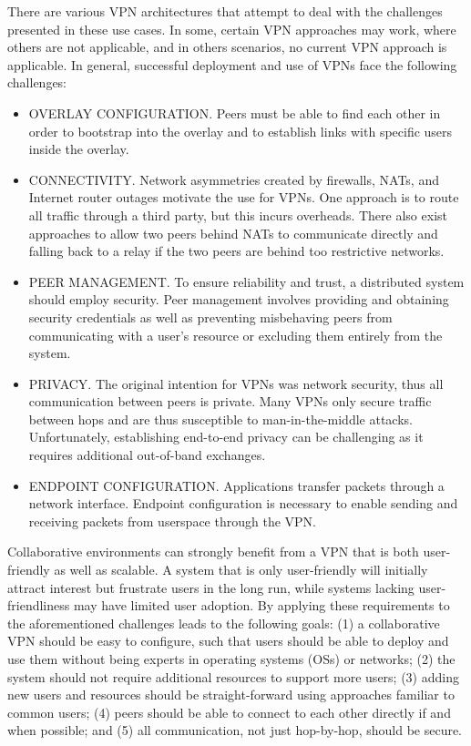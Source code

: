There are various VPN architectures that attempt to deal with the challenges
presented in these use cases.  In some, certain VPN approaches may work, where
others are not applicable, and in others scenarios, no current VPN approach is
applicable.  In general, successful deployment and use of VPNs face the
following challenges:  

\begin{itemize}

\item OVERLAY CONFIGURATION. Peers must be able to find each other in order to
bootstrap into the overlay and to establish links with specific users inside
the overlay.

\item CONNECTIVITY. Network asymmetries created by firewalls, NATs, and
Internet router outages motivate the use for VPNs.  One approach is to route
all traffic through a third party, but this incurs overheads.  There also exist
approaches to allow two peers behind NATs to communicate directly and falling
back to a relay if the two peers are behind too restrictive networks.

\item PEER MANAGEMENT. To ensure reliability and trust, a distributed system
should employ security.  Peer management involves providing and obtaining
security credentials as well as preventing misbehaving peers from communicating
with a user's resource or excluding them entirely from the system.

\item PRIVACY. The original intention for VPNs was network security, thus all
communication between peers is private.  Many VPNs only secure traffic between
hops and are thus susceptible to man-in-the-middle attacks.  Unfortunately,
establishing end-to-end privacy can be challenging as it requires additional
out-of-band exchanges.

\item ENDPOINT CONFIGURATION. Applications transfer packets through a network
interface.  Endpoint configuration is necessary to enable sending and receiving
packets from userspace through the VPN.

\end{itemize}

Collaborative environments can strongly benefit from a VPN that is both
user-friendly as well as scalable.  A system that is only user-friendly will
initially attract interest but frustrate users in the long run, while systems
lacking user-friendliness may have limited user adoption.  By applying these
requirements to the aforementioned challenges leads to the following goals:
(1) a collaborative VPN should be easy to configure, such that users should be
able to deploy and use them without being experts in operating systems (OSs) or
networks; (2) the system should not require additional resources to support
more users; (3) adding new users and resources should be straight-forward using
approaches familiar to common users; (4) peers should be able to connect to
each other directly if and when possible; and (5) all communication, not just
hop-by-hop, should be secure.

